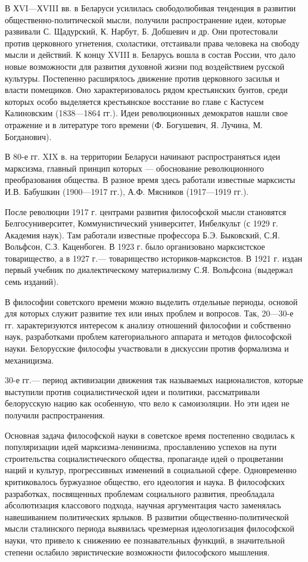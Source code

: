 В ХVI—ХVIII вв. в Беларуси усилилась свободолюбивая тенденция в развитии общественно-политической мысли, получили распространение идеи, которые развивали С. Щадурский, К. Нарбут, Б. Добшевич и др. Они протестовали против церковного угнетения, схоластики, отстаивали права человека на свободу мысли и действий. К концу XVIII в. Беларусь вошла в состав России, что дало новые возможности для развития духовной жизни под воздействием русской культуры. Постепенно расширялось движение против церковного засилья и власти помещиков. Оно характеризовалось рядом крестьянских бунтов, среди которых особо выделяется крестьянское восстание во главе с Кастусем Калиновским (1838—1864 гг.). Идеи революционных демократов нашли свое отражение и в литературе того времени (Ф. Богушевич, Я. Лучина, М. Богданович).

В 80-е гг. XIX в. на территории Беларуси начинают распространяться идеи марксизма, главный принцип которых — обоснование революционного преобразования общества. В разное время здесь работали известные марксисты И.В. Бабушкин (1900—1917 гг.), А.Ф. Мясников (1917—1919 гг.).

После революции 1917 г. центрами развития философской мысли становятся Белгосуниверситет, Коммунистический университет, Инбелкульт (с 1929 г. Академия наук). Там работали известные профессора Б.Э. Быковский, С.Я. Вольфсон, С.З. Каценбоген. В 1923 г. было организовано марксистское товарищество, а в 1927 г.— товарищество историков-марксистов. В 1921 г. издан первый учебник по диалектическому материализму С.Я. Вольфсона (выдержал семь изданий).

В философии советского времени можно выделить отдельные периоды, основой для которых служит развитие тех или иных проблем и вопросов. Так, 20—30-е гг. характеризуются интересом к анализу отношений философии и собственно наук, разработками проблем категориального аппарата и методов философской науки. Белорусские философы участвовали в дискуссии против формализма и механицизма.

30-е гг.— период активизации движения так называемых националистов, которые выступили против социалистической идеи и политики, рассматривали белорусскую нацию как особенную, что вело к самоизоляции. Но эти идеи не получили распространения.

Основная задача философской науки в советское время постепенно сводилась к популяризации идей марксизма-ленинизма, прославлению успехов на пути строительства социалистического общества, пропаганде идей о процветании наций и культур, прогрессивных изменений в социальной сфере. Одновременно критиковалось буржуазное общество, его идеология и наука. В философских разработках, посвященных проблемам социального развития, преобладала абсолютизация классового подхода, научная аргументация часто заменялась навешиванием политических ярлыков. В развитии общественно-политической мысли сталинского периода выявилась чрезмерная идеологизация философской науки, что привело к снижению ее познавательных функций, в значительной степени ослабило эвристические возможности философского мышления.

